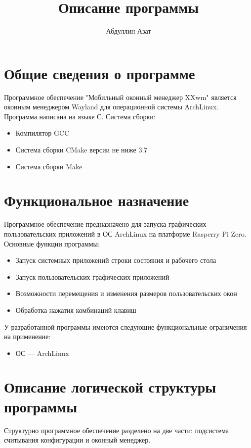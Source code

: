 \documentclass[10pt,a4paper]{report}
\author{Абдуллин Азат}
\title{Описание программы}
\begin{document}
	\maketitle
	\renewcommand{\thesection}{\arabic{section}}
	\tableofcontents
	\pagebreak
	
\section{Общие сведения о программе}
Программное обеспечение "Мобильный оконный менеджер XXwm" является оконным менеджером Wayland для операционной системы ArchLinux. Программа написана на языке С. Система сборки:
\begin{itemize}
\item Компилятор GCC
\item Система сборки CMake версии не ниже 3.7
\item Система сборки Make
\end{itemize}
		
\section{Функциональное назначение}
Программное обеспечение предназначено для запуска графических пользовательских приложений в ОС ArchLinux на платформе Rasperry Pi Zero.
Основные функции программы:
\begin{itemize}
\item Запуск системных приложений строки состояния и рабочего стола
\item Запуск пользовательских графических приложений
\item Возможности перемещения и изменения размеров пользовательских окон
\item Обработка нажатия комбинаций клавиш
\end{itemize}

У разработанной программы имеются следующие функциональные ограничения на применение:
\begin{itemize}
\item ОС --- ArchLinux
\end{itemize}
		
\section{Описание логической структуры программы}
Структурно программное обеспечение разделено на две части: подсистема считывания конфигурации и оконный менеджер.
		
\end{document}
